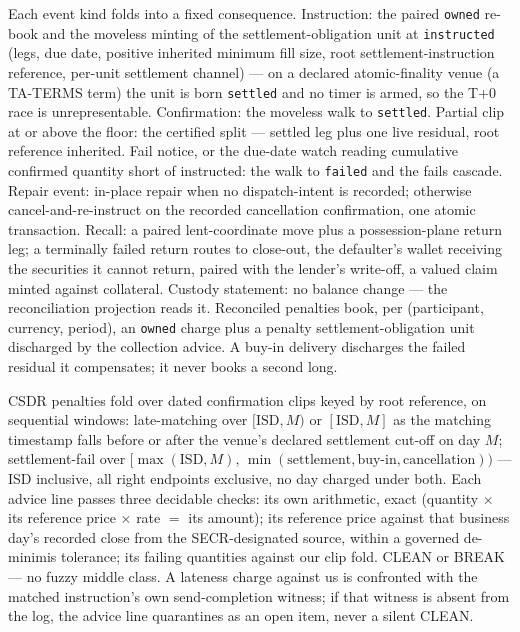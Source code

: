 \documentclass[11pt]{article}
\begin{document}
Each event kind folds into a fixed consequence. Instruction: the paired
\texttt{owned} re-book and the moveless minting of the settlement-obligation unit at
\texttt{instructed} (legs, due date, positive inherited minimum fill size, root
settlement-instruction reference, per-unit settlement channel) --- on a declared
atomic-finality venue (a TA-TERMS term) the unit is born \texttt{settled} and no
timer is armed, so the T+0 race is unrepresentable. Confirmation: the moveless walk
to \texttt{settled}. Partial clip at or above the floor: the certified split ---
settled leg plus one live residual, root reference inherited. Fail notice, or the
due-date watch reading cumulative confirmed quantity short of instructed: the walk
to \texttt{failed} and the fails cascade. Repair event: in-place repair when no
dispatch-intent is recorded; otherwise cancel-and-re-instruct on the recorded
cancellation confirmation, one atomic transaction. Recall: a paired lent-coordinate
move plus a possession-plane return leg; a terminally failed return routes to
close-out, the defaulter's wallet receiving the securities it cannot return, paired
with the lender's write-off, a valued claim minted against collateral. Custody
statement: no balance change --- the reconciliation projection reads it.
Reconciled penalties book, per (participant, currency, period), an \texttt{owned}
charge plus a penalty settlement-obligation unit discharged by the collection
advice. A buy-in delivery discharges the failed residual it compensates; it never
books a second long.

CSDR penalties fold over dated confirmation clips keyed by root reference, on
sequential windows: late-matching over $[\mathrm{ISD}, M)$ or $[\mathrm{ISD}, M]$
as the matching timestamp falls before or after the venue's declared settlement
cut-off on day $M$; settlement-fail over $[\max(\mathrm{ISD}, M),\,
\min(\text{settlement},\text{buy-in},\text{cancellation}))$ --- ISD inclusive, all
right endpoints exclusive, no day charged under both. Each advice line passes
three decidable checks: its own arithmetic, exact (quantity $\times$ its reference
price $\times$ rate $=$ its amount); its reference price against that business
day's recorded close from the SECR-designated source, within a governed
de-minimis tolerance; its failing quantities against our clip fold. CLEAN or
BREAK --- no fuzzy middle class. A lateness charge against us is confronted with
the matched instruction's own send-completion witness; if that witness is absent
from the log, the advice line quarantines as an open item, never a silent CLEAN.
\end{document}
